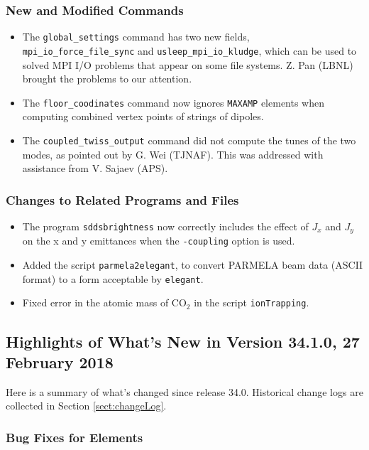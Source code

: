 \documentclass[11pt]{article}
\begin{document}
\subsubsection{New and Modified Commands}
\begin{itemize}
\item The \verb|global_settings| command has two new fields, \verb|mpi_io_force_file_sync| and \verb|usleep_mpi_io_kludge|,
  which can be used to solved MPI I/O problems that appear on some file systems. Z. Pan (LBNL) brought the problems to our
  attention.
\item The \verb|floor_coodinates| command now ignores \verb|MAXAMP| elements when computing combined vertex points
  of strings of dipoles.
\item The \verb|coupled_twiss_output| command did not compute the tunes of the two modes, as pointed out by
  G. Wei (TJNAF). This was addressed with assistance from V. Sajaev (APS).
\end{itemize}

\subsubsection{Changes to Related Programs and Files}

\begin{itemize}
\item The program \verb|sddsbrightness| now correctly includes the effect of $J_x$ and $J_y$ on the x and y emittances
  when the \verb|-coupling| option is used.
\item Added the script \verb|parmela2elegant|, to convert PARMELA beam data (ASCII format) to a form
  acceptable by \verb|elegant|.
\item Fixed error in the atomic mass of CO$_2$ in the script \verb|ionTrapping|.
\end{itemize}


\subsection{Highlights of What's New in Version 34.1.0, 27 February 2018}

Here is a summary of what's changed since release 34.0.
Historical change logs are collected in Section \ref{sect:changeLog}.

\subsubsection{Bug Fixes for Elements}
\end{document}
